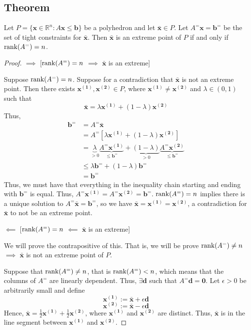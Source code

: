\begin{thmbox}
    \subsection{Theorem}
    Let $ P=\{\bm{x}\in\mathbb{R}^n:A \bm{x}\le \bm{b}\} $ be 
    a polyhedron and let $ \bm{\bar{x}}\in P $. 
    Let $ A^=\bm{x} = \bm{b}^= $ be the set of tight constraints
    for $ \bm{\bar{x}} $. 
    Then $\bm{\bar{x}}$ is an extreme point of $ P $ if and only if
    $ \operatorname{rank}(A^=)=n $.
\end{thmbox}

\begin{proof}
    $ \implies $ [$\operatorname{rank}(A^=)=n$ $ \implies $ $\bm{\bar{x}}$ is an extreme]
    
    Suppose $ \operatorname{rank}(A^=)=n $. Suppose for a contradiction that
    $\bm{\bar{x}}$ is not an extreme point. Then there exists
    $ \bm{x^{(1)}}, \bm{x^{(2)}}\in P$, where
    $ \bm{x^{(1)}} \neq \bm{x^{(2)}} $ and $ \lambda\in(0,1) $
    such that
    \[ \bm{\bar{x}}=\lambda \bm{x^{(1)}}+(1-\lambda)\bm{x^{(2)}}\]
    Thus,
    \begin{align*}
        \bm{b^=}&=A^=\bm{\bar{x}}\\
        &=A^=[\lambda \bm{x^{(1)}}+(1-\lambda)\bm{x^{(2)}}]\\
        &=\underbrace{\lambda}_{>0}
        \underbrace{A^=\bm{x^{(1)}}}_{\le \bm{b^=}}
        +\underbrace{(1-\lambda)}_{>0} 
        \underbrace{A^=\bm{x^{(2)}}}_{\le \bm{b^=}}\\
        &\le\lambda\bm{b^=}+(1-\lambda)\bm{b^=}\\
        &=\bm{b^=}
    \end{align*}
    Thus, we must have that everything in the inequality chain
    starting and ending with $ \bm{b^=} $ is equal. Thus,
    $ A^=\bm{x^{(1)}}=A^=\bm{x^{(2)}}=\bm{b^=}$.
    $ \operatorname{rank}(A^=)=n $ implies there is a unique solution
    to $ A^=\bm{\bar{x}}=\bm{b^=}$, so we have 
    $ \bm{\bar{x}}=\bm{x^{(1)}}=\bm{x^{(2)}} $, a contradiction for
    $ \bm{\bar{x}} $ to not be an extreme point.

    $ \impliedby $ [$\operatorname{rank}(A^=)=n$ $ \impliedby $ $\bm{\bar{x}}$ is an extreme]

    We will prove the contrapositive of this. That is, we will be prove
    $ \operatorname{rank}(A^=)\neq n $ $\implies$ $\bm{\bar{x}}$ is not 
    an extreme point of $ P $.

    Suppose that $ \operatorname{rank}(A^=)\neq n $, that is $ \operatorname{rank}(A^=)<n $, which
    means that the columns of $ A^= $ are linearly dependent. Thus,
    $ \exists \bm{d} $ such that $ A^=\bm{d}=\bm{0} $. Let
    $ \epsilon > 0 $ be arbitrarily small and define
    \[ \bm{x^{(1)}} := \bm{\bar{x}} + \epsilon \bm{d} \]
    \[ \bm{x^{(2)}} := \bm{\bar{x}} - \epsilon \bm{d} \]
Hence, $ \bm{\bar{x}}=\frac{1}{2}\bm{x^{(1)}}+\frac{1}{2} \bm{x^{(2)}} $, where
$ \bm{x^{(1)}} $ and $ \bm{x^{(2)}} $ are distinct. Thus,
$ \bm{\bar{x}} $ is in the line segment between $ \bm{x^{(1)}} $ and
$ \bm{x^{(2)}} $. 


\end{proof}
